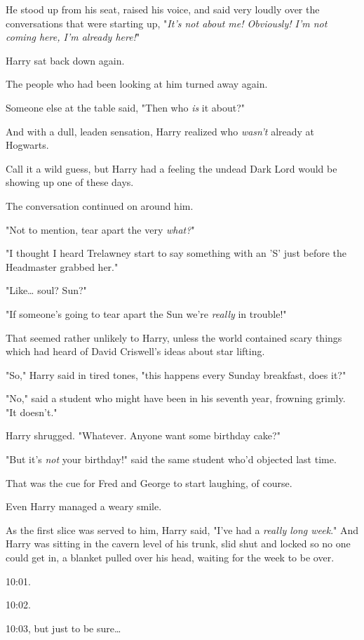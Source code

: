 He stood up from his seat, raised his voice, and said very loudly over the 
conversations that were starting up, "\emph{It's not about me! Obviously! I'm 
not coming here, I'm already here!}"

Harry sat back down again.

The people who had been looking at him turned away again.

Someone else at the table said, "Then who \emph{is} it about?"

And with a dull, leaden sensation, Harry realized who \emph{wasn't} already at 
Hogwarts.

Call it a wild guess, but Harry had a feeling the undead Dark Lord would be 
showing up one of these days.

The conversation continued on around him.

"Not to mention, tear apart the very \emph{what?}"

"I thought I heard Trelawney start to say something with an 'S' just before the 
Headmaster grabbed her."

"Like{\ldots} soul? Sun?"

"If someone's going to tear apart the Sun we're \emph{really} in trouble!"

That seemed rather unlikely to Harry, unless the world contained scary things 
which had heard of David Criswell's ideas about star lifting.

"So," Harry said in tired tones, "this happens every Sunday breakfast, does it?"

"No," said a student who might have been in his seventh year, frowning grimly. 
"It doesn't."

Harry shrugged. "Whatever. Anyone want some birthday cake?"

"But it's \emph{not} your birthday!" said the same student who'd objected last 
time.

That was the cue for Fred and George to start laughing, of course.

Even Harry managed a weary smile.

As the first slice was served to him, Harry said, "I've had a \emph{really long 
week}."
\sbreak
And Harry was sitting in the cavern level of his trunk, slid shut and locked so 
no one could get in, a blanket pulled over his head, waiting for the week to be 
over.

10:01.

10:02.

10:03, but just to be sure{\ldots}

